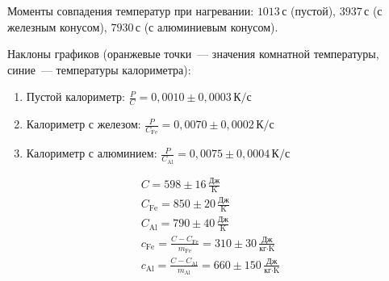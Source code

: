 \documentclass[a4paper, 12pt]{article}
\begin{document}
    Моменты совпадения температур при нагревании: $1013\,\text{с}$ (пустой),
    $3937\,\text{с}$ (с железным конусом), $7930\,\text{с}$ (с алюминиевым конусом).

    Наклоны графиков (оранжевые точки~--- значения комнатной температуры, синие~---
    температуры калориметра):
    \begin{enumerate}
        \item Пустой калориметр: $\frac{P}{C}=0{,}0010\pm 0{,}0003\,\text{К}/\text{с}$
        \item Калориметр с железом: $\frac{P}{C_\text{Fe}}=0{,}0070\pm 0{,}0002\,\text{К}/\text{с}$
        \item Калориметр с алюминием: $\frac{P}{C_\text{Al}}=0{,}0075\pm 0{,}0004\,\text{К}/\text{с}$
    \end{enumerate}

    \begin{gather*}
        C=598\pm16\,\frac{\text{Дж}}{\text{K}} \\
        C_\text{Fe}=850\pm20\,\frac{\text{Дж}}{\text{K}} \\
        C_\text{Al}=790\pm40\,\frac{\text{Дж}}{\text{K}} \\
        c_\text{Fe}=\frac{C-C_\text{Fe}}{m_\text{Fe}}=310\pm 30\,\frac{\text{Дж}}{\text{кг}\cdot\text{K}} \\
        c_\text{Al}=\frac{C-C_\text{Al}}{m_\text{Al}}=660\pm 150\,\frac{\text{Дж}}{\text{кг}\cdot\text{K}}
    \end{gather*}
\end{document}
